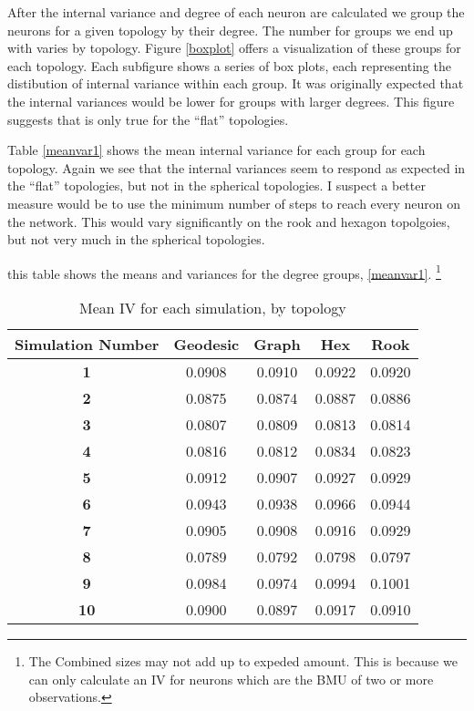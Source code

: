 After the internal variance and degree of each neuron are calculated we
group the neurons for a given topology by their degree. The number for groups
we end up with varies by topology. Figure \ref{boxplot} offers a visualization
of these groups for each topology.  Each subfigure shows a series of box
plots, each representing the distibution of internal variance within each
group.  It was originally expected that the internal variances would be lower
for groups with larger degrees. This figure suggests that is only true for the
``flat'' topologies.

Table \ref{meanvar1} shows the mean internal variance for each group for each
topology. Again we see that the internal variances seem to respond as expected
in the ``flat'' topologies, but not in the spherical topologies.  I suspect a
better measure would be to use the minimum number of steps to reach every
neuron on the network.  This would vary significantly on the rook and hexagon
topolgoies, but not very much in the spherical topologies.


this table shows the means and variances for the degree groups,
\ref{meanvar1}. \footnote{The Combined sizes may not add up to expeded amount.
This is because we can only calculate an IV for neurons which are the BMU of
two or more observations.}

\begin{table}
\centering
\caption{Mean IV for each simulation, by topology}
\label{ivtable3}
\begin{tabular}{|c||c|c|c|c|}
\hline
\textbf{Simulation Number} & Geodesic & Graph & Hex & Rook \\
\hline
\hline
\textbf{1} & 0.0908 & 0.0910 & 0.0922 & 0.0920 \\
\hline
\textbf{2} & 0.0875 & 0.0874 & 0.0887 & 0.0886 \\
\hline
\textbf{3} & 0.0807 & 0.0809 & 0.0813 & 0.0814 \\
\hline
\textbf{4} & 0.0816 & 0.0812 & 0.0834 & 0.0823 \\
\hline
\textbf{5} & 0.0912 & 0.0907 & 0.0927 & 0.0929 \\
\hline
\textbf{6} & 0.0943 & 0.0938 & 0.0966 & 0.0944 \\
\hline
\textbf{7} & 0.0905 & 0.0908 & 0.0916 & 0.0929 \\
\hline
\textbf{8} & 0.0789 & 0.0792 & 0.0798 & 0.0797 \\
\hline
\textbf{9} & 0.0984 & 0.0974 & 0.0994 & 0.1001 \\
\hline
\textbf{10} & 0.0900 & 0.0897 & 0.0917 & 0.0910 \\
\hline
\end{tabular} \end{table}




